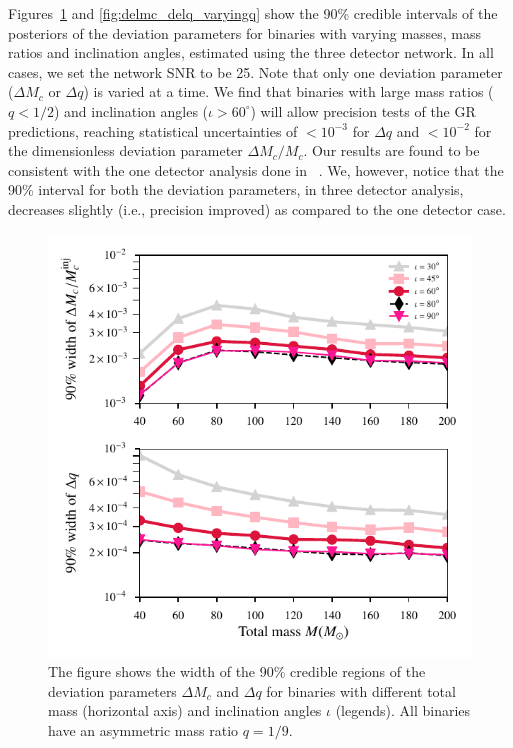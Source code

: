 \documentclass[prd,preprintnumbers,twocolumn,eqsecnum,floatfix,a4paper,nofootinbib,superscriptaddress]{revtex4}
\begin{document}
 Figures~\ref{fig:delmc_delq_varyingM} and \ref{fig:delmc_delq_varyingq} show the 90\% credible intervals of the posteriors of the deviation parameters for binaries with varying masses, mass ratios and inclination angles, estimated using the three detector network. In all cases, we set the network SNR to be {25}. Note that only one deviation parameter ($\Delta M_c$ or $\Delta q$) is varied at a time.  We find that binaries with large mass ratios ($q < 1/ 2$) and inclination angles ($\iota > 60 ^\circ $) will allow precision tests of the GR predictions, reaching statistical uncertainties of $< 10^{-3}$ for $\Delta q$ and $< 10^{-2}$ for the dimensionless deviation parameter $\Delta M_c/M_c$. Our results are found to be consistent with the one detector analysis done in ~\cite{dhanpal2018}. We, however, notice that the 90\% interval for both the deviation parameters, in three detector analysis, decreases slightly (i.e., precision improved) as compared to the one detector case.
 
 \begin{figure}[tbh]
 	\begin{center}
 		\includegraphics[scale=0.8]{figs/hm_9dim_dmcbymcinj_dq_diff_M.pdf}
 	\end{center} 
 	\caption{The figure shows the width of the 90$\%$ credible regions of the deviation parameters $\Delta M_c$ and $\Delta q$ for binaries with different total mass (horizontal axis) and inclination angles $\iota$ (legends). All binaries have an asymmetric mass ratio $q=1/9$.}
 	\label{fig:delmc_delq_varyingM}
 \end{figure}
 
\end{document}
